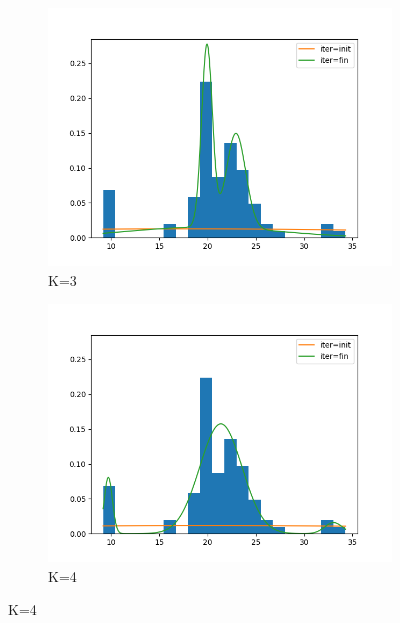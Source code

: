 
\begin{figure}
     \centering
     \begin{subfigure}[b]{0.3\textwidth}
         \centering
         \includegraphics[width=\textwidth]{../code/stochastic_loc_scale_plots/galaxies_hist_k_3.png}
         \caption{K=3}
         \label{fig:Stoch_loc_scale3}
     \end{subfigure}
     \hfill
     \begin{subfigure}[b]{0.3\textwidth}
         \centering
         \includegraphics[width=\textwidth]{../code/stochastic_loc_scale_plots/galaxies_hist_k_4.png}
         \caption{K=4}
         \label{fig:Stoch_loc_scale4}
     \end{subfigure}
     \hfill

\end{figure}

